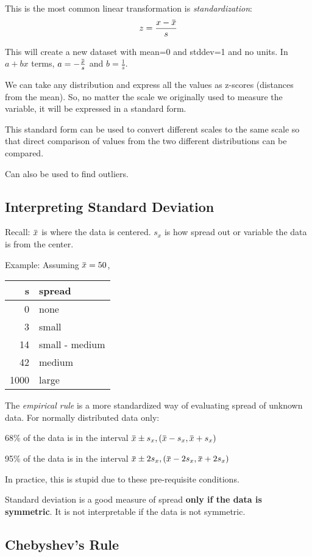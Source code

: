 \documentclass[11pt, oneside]{article}   	%
\newcommand{\overbar}[1]{\mkern 1.5mu\overline{\mkern-1.5mu#1\mkern-1.5mu}\mkern 1.5mu}
\begin{document}
This is the most common linear transformation is \textit{standardization}:
\[
z = \frac{x - \overbar{x}} {s}
\]

This will create a new dataset with mean=0 and stddev=1 and no units. In $a + bx$ terms, $a = -\frac{\overbar{x}}{s}$ and $b=\frac{1}{s}$.

We can take any distribution and express all the values
as z-scores (distances from the mean). So, no matter the
scale we originally used to measure the variable, it will
be expressed in a standard form.

This standard form can be used to convert different
scales to the same scale so that direct comparison of
values from the two different distributions can be compared.

Can also be used to find outliers.

\subsection{Interpreting Standard Deviation}

Recall: $\overbar{x}$ is where the data is centered. $s_x$ is how spread out or variable the data is from the center.

Example: Assuming $\overbar{x} = 50$,

\begin{tabular}{r | l}
s & spread \\
\hline
0 & none \\
3 & small \\
14 & small - medium \\
42 & medium \\
1000 & large \\
\end{tabular}

The \textit{empirical rule} is a more standardized way of evaluating spread of unknown data. For normally distributed data only:

68\% of the data is in the interval $\overbar{x} \pm s_x, (\overbar{x} - s_x, \overbar{x} + s_x)$ 

95\% of the data is in the interval $\overbar{x} \pm 2s_x, (\overbar{x} - 2s_x, \overbar{x} + 2s_x)$

In practice, this is stupid due to these pre-requisite conditions. 

Standard deviation is a good measure of spread \textbf{only if the data is symmetric}. It is not interpretable if the data is not symmetric.

\subsection{Chebyshev's Rule}
\end{document}
